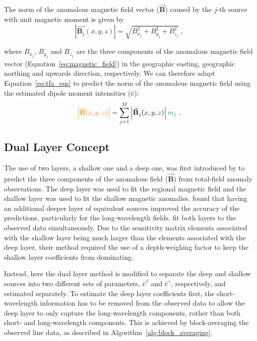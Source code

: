 The norm of the anomalous magnetic field vector ($\vec{\mathbf{B}}$) caused by the $j$-th source with unit magnetic moment is given by
\begin{equation}
    \left\lvert \vec{\mathbf{B}_j}(x,y,z) \right\rvert = \sqrt{B^2_{x_j} + B^2_{y_j} +B^2_{z_j}}
    \ ,
\end{equation}

\noindent
where $B_{x_j}$, $B_{y_j}$ and $B_{z_j}$ are the three components of the anomalous magnetic field vector (Equation~\ref{eq:magnetic_field}) in the geographic easting, geographic northing and upwards direction, respectively. We can therefore adapt Equation~\ref{eq:tfa_eqs} to predict the norm of the anomalous magnetic field using the estimated dipole moment intensities (\textcolor{teal}{$\bar{\mathbf{c}}$}):
\begin{equation}
\textcolor{orange}{\left\lvert \vec{\mathbf{B}}(x,y,z) \right\rvert} = \sum_{j=1}^{M}  \left\lvert \vec{\mathbf{B}}_{j}(x,y,z) \right\rvert \textcolor{teal}{m_j}
\ .
\end{equation}


\subsection{Dual Layer Concept}

The use of two layers, a shallow one and a deep one, was first introduced by \citet{Li2020} to predict the three components of the anomalous field ($\vec{\mathbf{B}}$) from total-field anomaly observations. The deep layer was used to fit the regional magnetic field and the shallow layer was used to fit the shallow magnetic anomalies. \citet{Li2020} found that having an additional deeper layer of equivalent sources improved the accuracy of the predictions, particularly for the long‐wavelength fields. \citet{Li2020} fit both layers to the observed data simultaneously. Due to the sensitivity matrix elements associated with the shallow layer being much larger than the elements associated with the deep layer, their method required the use of a depth-weighing factor to keep the shallow layer coefficients from dominating.

Instead, here the dual layer method is modified to separate the deep and shallow sources into two different sets of parameters, \textcolor{teal}{$\bar{\mathbf{c}}^d$} and \textcolor{teal}{$\bar{\mathbf{c}}^s$}, respectively, and estimated separately. To estimate the deep layer coefficients first, the short-wavelength information has to be removed from the observed data to allow the deep layer to only capture the long-wavelength components, rather than both short- and long-wavelength components. This is achieved by block-averaging the observed line data, as described in Algorithm~\ref{alg:block_averaging}.

